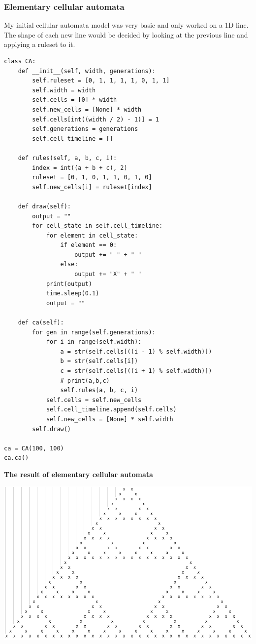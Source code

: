 \documentclass[11pt, a4paper]{article}
\begin{document}
\subsubsection{Elementary cellular automata}
My initial cellular automata model was very basic and only worked on a 1D line. The shape of each new line would be decided by looking at the previous line and applying a ruleset to it.
\begin{lstlisting}
class CA:
    def __init__(self, width, generations):
        self.ruleset = [0, 1, 1, 1, 1, 0, 1, 1]
        self.width = width
        self.cells = [0] * width
        self.new_cells = [None] * width
        self.cells[int((width / 2) - 1)] = 1
        self.generations = generations
        self.cell_timeline = []

    def rules(self, a, b, c, i):
        index = int((a + b + c), 2)
        ruleset = [0, 1, 0, 1, 1, 0, 1, 0]
        self.new_cells[i] = ruleset[index]

    def draw(self):
        output = ""
        for cell_state in self.cell_timeline:
            for element in cell_state:
                if element == 0:
                    output += " " + " "
                else:
                    output += "X" + " "
            print(output)
            time.sleep(0.1)
            output = ""

    def ca(self):
        for gen in range(self.generations):
            for i in range(self.width):
                a = str(self.cells[((i - 1) % self.width)])
                b = str(self.cells[i])
                c = str(self.cells[((i + 1) % self.width)])
                # print(a,b,c)
                self.rules(a, b, c, i)
            self.cells = self.new_cells
            self.cell_timeline.append(self.cells)
            self.new_cells = [None] * self.width
        self.draw()

ca = CA(100, 100)
ca.ca()
\end{lstlisting}
\textbf{The result of elementary cellular automata}

\includegraphics[width=\textwidth]{eca.png}
\end{document}
